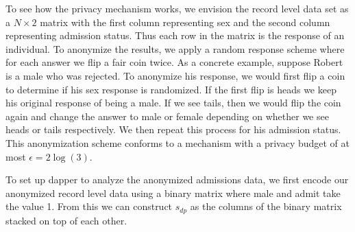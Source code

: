 To see how the privacy mechanism works, we envision the record level data set as a \(N \times 2\) matrix with
the first column representing sex and the second column representing
admission status. Thus each row in the matrix is the response of an
individual. To anonymize the results, we apply a random response scheme
where for each answer we flip a fair coin twice. As a concrete example,
suppose Robert is a male who was rejected. To anonymize his response,
we would first flip a coin to determine if his sex response is randomized. If
the first flip is heads we keep his original response of being a male. If we see tails,
then we would flip the coin again and change the answer to male or female depending
on whether we see heads or tails respectively. We then repeat this process for
his admission status. This anonymization scheme conforms to a mechanism with
a privacy budget of at most \(\epsilon = 2\log(3)\).

To set up dapper to analyze the anonymized admissions data, we first encode our anonymized record level data using
a binary matrix where male and admit take the value 1. From this
we can construct \(s_{dp}\) as the columns of the binary
matrix stacked on top of each other.

